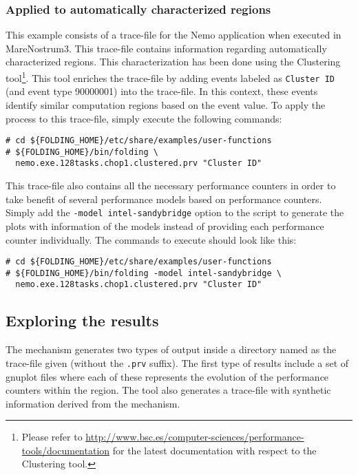 \subsubsection{Applied to automatically characterized regions}\label{subsubsec:ClusteredExample}

This example consists of a trace-file for the Nemo application when executed in MareNostrum3.
This trace-file contains information regarding automatically characterized regions.
This characterization has been done using the Clustering tool\footnote{Please refer to \url{http://www.bsc.es/computer-sciences/performance-tools/documentation} for the latest documentation with respect to the Clustering tool.}.
This tool enriches the trace-file by adding events labeled as \texttt{Cluster ID} (and event type 90000001) into the trace-file.
In this context, these events identify similar computation regions based on the event value.
To apply the \FOLDING process to this trace-file, simply execute the following commands:

\begin{verbatim}
# cd ${FOLDING_HOME}/etc/share/examples/user-functions
# ${FOLDING_HOME}/bin/folding \
  nemo.exe.128tasks.chop1.clustered.prv "Cluster ID"
\end{verbatim}

This trace-file also contains all the necessary performance counters in order to take benefit of several performance models based on performance counters.
Simply add the \texttt{-model intel-sandybridge} option to the \FOLDING script to generate the plots with information of the models instead of providing each performance counter individually.
The commands to execute should look like this:

\begin{verbatim}
# cd ${FOLDING_HOME}/etc/share/examples/user-functions
# ${FOLDING_HOME}/bin/folding -model intel-sandybridge \
  nemo.exe.128tasks.chop1.clustered.prv "Cluster ID"
\end{verbatim}

\subsection{Exploring the results}

The \FOLDING mechanism generates two types of output inside a directory named as the trace-file given (without the \texttt{.prv} suffix).
The first type of results include a set of gnuplot files where each of these represents the evolution of the performance counters within the region.
The tool also generates a \PARAVER trace-file with synthetic information derived from the \FOLDING mechanism.

